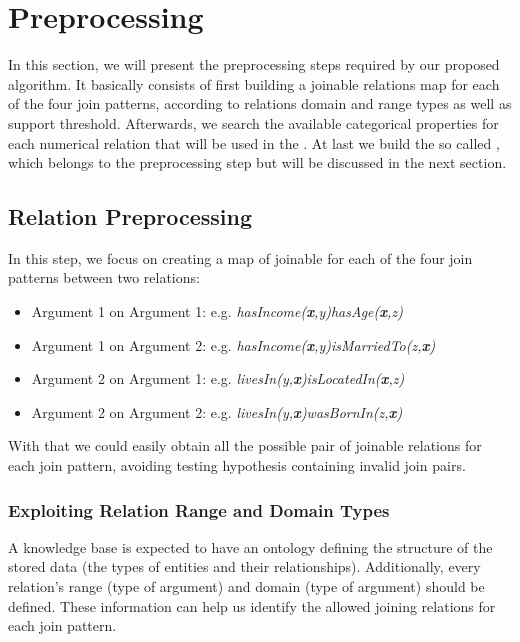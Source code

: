 \section{Preprocessing}

In this section, we will present the preprocessing steps required by our proposed algorithm. It basically consists of
first building a joinable relations map for each of the four join patterns, according
to relations domain and range types as well as support threshold. Afterwards, we search the available categorical
properties for each numerical relation that will be used in the \graphname. At last we build the so called \graphname,
which belongs to the preprocessing step but will be discussed in the next section.

\subsection{Relation Preprocessing}

In this step, we focus on creating a map of joinable for each of the four join patterns between two relations:

\begin{itemize}
 \item Argument 1 on Argument 1: e.g. \emph{hasIncome(\textbf{x},y)hasAge(\textbf{x},z)}
 \item Argument 1 on Argument 2: e.g. \emph{hasIncome(\textbf{x},y)isMarriedTo(z,\textbf{x})}
 \item Argument 2 on Argument 1: e.g. \emph{livesIn(y,\textbf{x})isLocatedIn(\textbf{x},z)}
 \item Argument 2 on Argument 2: e.g. \emph{livesIn(y,\textbf{x})wasBornIn(z,\textbf{x})}
\end{itemize}

With that we could easily obtain all the possible pair of joinable relations for each join pattern, avoiding testing
hypothesis containing invalid join pairs.

\subsubsection{Exploiting Relation Range and Domain Types}

A knowledge base is expected to have an ontology defining the structure of the stored data (the types of entities and
their relationships). Additionally, every relation's range (type of  argument) and domain (type of 
argument) should be defined. These information can help us identify the allowed joining relations for each join pattern.

